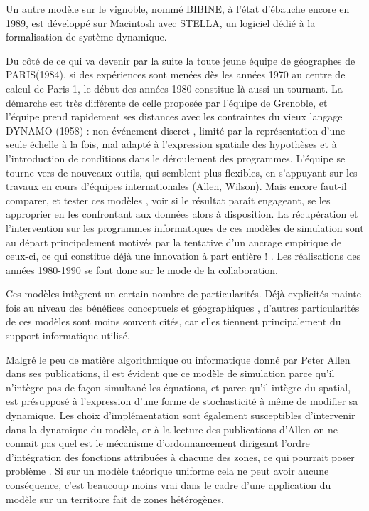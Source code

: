 Un autre modèle sur le vignoble, nommé BIBINE, à l'état d'ébauche encore en 1989, est développé sur Macintosh avec STELLA, un logiciel dédié à la formalisation de système dynamique. \autocite{Chamussy1989}

Du côté de ce qui va devenir par la suite la toute jeune équipe de géographes de PARIS(1984), si des expériences sont menées dès les années 1970 au centre de calcul de Paris 1, le début des années 1980 constitue là aussi un tournant. La démarche est très différente de celle proposée par l'équipe de Grenoble, et l'équipe prend rapidement ses distances avec les contraintes du vieux langage DYNAMO (1958) : non événement discret \autocite{Nance1993}, limité par la représentation d'une seule échelle à la fois, mal adapté à l'expression spatiale des hypothèses et à l'introduction de conditions dans le déroulement des programmes. L'équipe se tourne vers de nouveaux outils, qui semblent plus flexibles, en s'appuyant sur les travaux en cours d'équipes internationales (Allen, Wilson). Mais encore faut-il comparer, et tester ces modèles \autocite{Pumain1983}, voir si le résultat paraît engageant, se les approprier en les confrontant aux données alors à disposition. La récupération et l'intervention sur les programmes informatiques de ces modèles de simulation sont au départ principalement motivés par la tentative d’un ancrage empirique de ceux-ci, ce qui constitue déjà une innovation à part entière ! \autocite{Pumain1982}. Les réalisations des années 1980-1990 se font donc sur le mode de la collaboration.

Ces modèles intègrent un certain nombre de particularités. Déjà explicités mainte fois au niveau des bénéfices conceptuels et géographiques \autocites{Pumain1989, Sanders1992}, d'autres particularités de ces modèles sont moins souvent cités, car elles tiennent principalement du support informatique utilisé.

Malgré le peu de matière algorithmique ou informatique donné par Peter Allen dans ses publications, il est évident que ce modèle de simulation parce qu'il n'intègre pas de façon simultané les équations, et parce qu'il intègre du spatial, est présupposé à l'expression d'une forme de stochasticité à même de modifier sa dynamique. Les choix d'implémentation sont également susceptibles d'intervenir dans la dynamique du modèle, or à la lecture des publications d'Allen on ne connait pas quel est le mécanisme d'ordonnancement dirigeant l'ordre d'intégration des fonctions attribuées à chacune des zones, ce qui pourrait poser problème \autocite[231-233]{Varenne2014}. Si sur un modèle théorique uniforme cela ne peut avoir aucune conséquence, c'est beaucoup moins vrai dans le cadre d'une application du modèle sur un territoire fait de zones hétérogènes.

